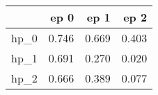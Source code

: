 \begin{tabular}{lrrr}
\toprule
{} &   ep 0 &   ep 1 &   ep 2 \\
\midrule
hp\_0 &  0.746 &  0.669 &  0.403 \\
hp\_1 &  0.691 &  0.270 &  0.020 \\
hp\_2 &  0.666 &  0.389 &  0.077 \\
\bottomrule
\end{tabular}

